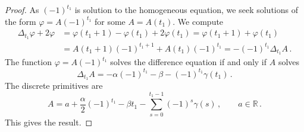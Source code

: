 \documentclass[10pt,a4paper]{amsart}
\newcommand{\R}{\mathbb{R}}
\begin{document}
    \begin{proof}
        As $(-1)^{t_1}$ is solution to the homogeneous equation, we seek solutions of the form $\varphi = A(-1)^{t_1}$ for some $A = A(t_1)$. We compute
        \begin{align*}
            \Delta_{t_1} \varphi + 2 \varphi &= \varphi(t_1 + 1) - \varphi(t_1) + 2 \varphi(t_1) = \varphi(t_1 + 1) + \varphi(t_1) \\
            &= A(t_1 + 1)(-1)^{t_1 + 1} + A(t_1)(-1)^{t_1} = -(-1)^{t_1} \Delta_{t_1} A \, .
        \end{align*}
        The function $\varphi = A(-1)^{t_1}$ solves the difference equation if and only if $A$ solves
        \begin{equation*}
            \Delta_{t_1} A = - \alpha (-1)^{t_1} - \beta - (-1)^{t_1} \gamma(t_1) \, .
        \end{equation*}
        The discrete primitives are 
        \begin{equation*}
            A = a + \frac{\alpha}{2} (-1)^{t_1} - \beta t_1 - \sum_{s=0}^{t_1-1} (-1)^s \gamma(s) \, , \qquad a \in \R \, .
        \end{equation*}
        This gives the result.
    \end{proof}
\end{document}
